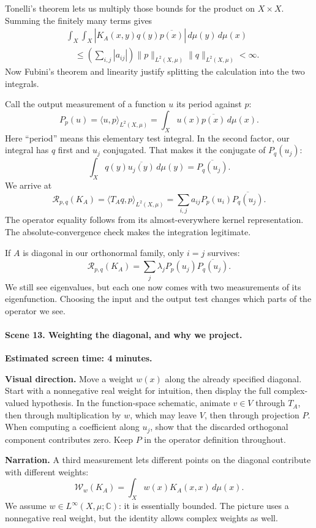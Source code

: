 Tonelli's theorem lets us multiply those bounds for the product on $X\times X$. Summing the finitely many terms gives
\[
\begin{aligned}
&\int_X\int_X|K_A(x,y)q(y)\overline{p(x)}|\,d\mu(y)\,d\mu(x)\\
&\quad\leq\left(\sum_{i,j}|a_{ij}|\right)
\|p\|_{L^2(X,\mu)}\|q\|_{L^2(X,\mu)}<\infty.
\end{aligned}
\]
Now Fubini's theorem and linearity justify splitting the calculation into the two integrals.

Call the output measurement of a function $u$ its period against $p$:
\[
P_p(u)=\langle u,p\rangle_{L^2(X,\mu)}
=\int_Xu(x)\overline{p(x)}\,d\mu(x).
\]
Here ``period'' means this elementary test integral. In the second factor, our integral has $q$ first and $u_j$ conjugated. That makes it the conjugate of $P_q(u_j)$:
\[
\int_Xq(y)\overline{u_j(y)}\,d\mu(y)
=\overline{P_q(u_j)}.
\]
We arrive at
\[
\boxed{\mathcal R_{p,q}(K_A)
=\langle T_Aq,p\rangle_{L^2(X,\mu)}
=\sum_{i,j}a_{ij}P_p(u_i)\overline{P_q(u_j)}.}
\]
The operator equality follows from its almost-everywhere kernel representation. The absolute-convergence check makes the integration legitimate.

If $A$ is diagonal in our orthonormal family, only $i=j$ survives:
\[
\mathcal R_{p,q}(K_A)
=\sum_j\lambda_j P_p(u_j)\overline{P_q(u_j)}.
\]
We still see eigenvalues, but each one now comes with two measurements of its eigenfunction. Choosing the input and the output test changes which parts of the operator we see.

\paragraph{Scene 13. Weighting the diagonal, and why we project.}
\textbf{Estimated screen time: 4 minutes.}

\textbf{Visual direction.} Move a weight $w(x)$ along the already specified diagonal. Start with a nonnegative real weight for intuition, then display the full complex-valued hypothesis. In the function-space schematic, animate $v\in V$ through $T_A$, then through multiplication by $w$, which may leave $V$, then through projection $P$. When computing a coefficient along $u_j$, show that the discarded orthogonal component contributes zero. Keep $P$ in the operator definition throughout.

\textbf{Narration.} A third measurement lets different points on the diagonal contribute with different weights:
\[
\mathcal W_w(K_A)=\int_Xw(x)K_A(x,x)\,d\mu(x).
\]
We assume $w\in L^\infty(X,\mu;\mathbb C)$: it is essentially bounded. The picture uses a nonnegative real weight, but the identity allows complex weights as well.

